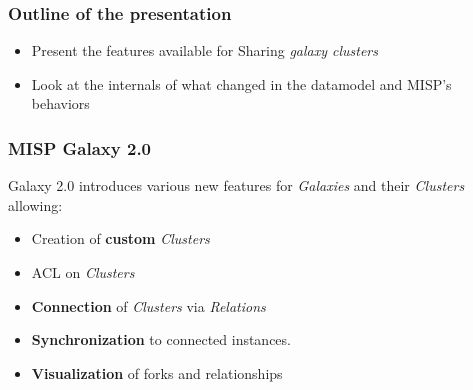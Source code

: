 
\begin{frame}[t,plain]
\titlepage
\end{frame}

\begin{frame}
    \frametitle{Outline of the presentation}
    \begin{itemize}
        \item Present the features available for Sharing \textit{galaxy clusters}
        \item Look at the internals of what changed in the datamodel and MISP's behaviors
    \end{itemize}
\end{frame}

\begin{frame}
    \frametitle{MISP Galaxy 2.0}
    Galaxy 2.0 introduces various new features for \textit{Galaxies} and their \textit{Clusters} allowing:
    \begin{itemize}
        \item Creation of \textbf{custom} \textit{Clusters}
        \item ACL on \textit{Clusters}
        \item \textbf{Connection} of \textit{Clusters} via \textit{Relations}
        \item \textbf{Synchronization} to connected instances.
        \item \textbf{Visualization} of forks and relationships
    \end{itemize}
\end{frame}


